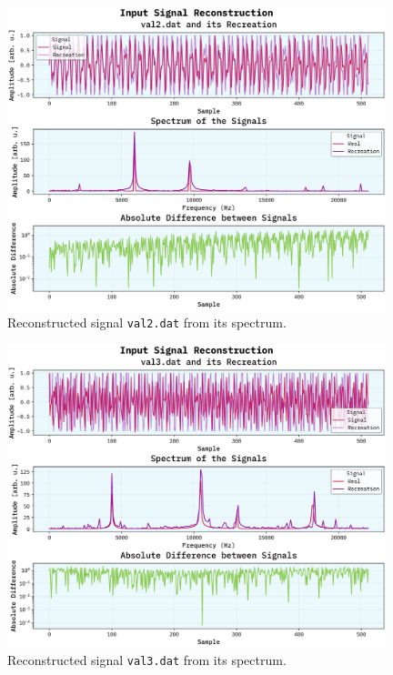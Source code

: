 \documentclass[10pt, titlepage, a4paper]{article}
\begin{document}
\begin{figure}[H]
    \centering
    \includegraphics[width=0.98\textwidth]{../SpectralAnalysis/Images/reconstruction-val2.dat.png}
    \caption{Reconstructed signal \texttt{val2.dat} from its spectrum.}
    \label{fig:reconstructed-signals-2} 
\end{figure}

\begin{figure}[H]
    \centering
    \includegraphics[width=0.98\textwidth]{../SpectralAnalysis/Images/reconstruction-val3.dat.png}
    \caption{Reconstructed signal \texttt{val3.dat} from its spectrum.}
    \label{fig:reconstructed-signals-3}
\end{figure}
\end{document}

